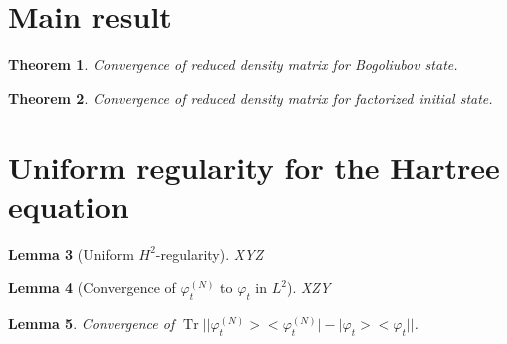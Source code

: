 \documentclass[11pt,a4paper,twoside,headsepline]{scrartcl}
\newtheorem{thm}{Theorem}[section]
\newtheorem{lem}[thm]{Lemma}
\newcommand{\ph}{\varphi_t^{(N)}}	%
\newcommand{\project}[1]{\lvert #1 \big>\big< #1\rvert}	%
\newcommand{\Tr}{\operatorname{Tr}}	%
\begin{document}
\section{Main result}
\begin{thm}
 Convergence of reduced density matrix for Bogoliubov state.
\end{thm}

\begin{thm}
 Convergence of reduced density matrix for factorized initial state.
\end{thm}


\section{Uniform regularity for the Hartree equation}
\begin{lem}[Uniform $H^2$-regularity]
 XYZ
\end{lem}
\begin{lem}[Convergence of $\ph$ to $\varphi_t$ in $L^2$]
 XZY
\end{lem}

\begin{lem}
 Convergence of $\Tr \lvert \project{\ph} - \project{\varphi_t} \rvert$.
\end{lem}




\end{document}

